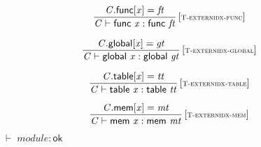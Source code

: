 \vspace{1ex}

$$
\begin{array}{@{}c@{}}\displaystyle
\frac{
{\mathit{C}}.\mathsf{func}{}[{\mathit{x}}] = {\mathit{ft}}
}{
{\mathit{C}} \vdash \mathsf{func}~{\mathit{x}} : \mathsf{func}~{\mathit{ft}}
} \, {[\textsc{\scriptsize T{-}externidx{-}func}]}
\qquad
\end{array}
$$

$$
\begin{array}{@{}c@{}}\displaystyle
\frac{
{\mathit{C}}.\mathsf{global}{}[{\mathit{x}}] = {\mathit{gt}}
}{
{\mathit{C}} \vdash \mathsf{global}~{\mathit{x}} : \mathsf{global}~{\mathit{gt}}
} \, {[\textsc{\scriptsize T{-}externidx{-}global}]}
\qquad
\end{array}
$$

$$
\begin{array}{@{}c@{}}\displaystyle
\frac{
{\mathit{C}}.\mathsf{table}{}[{\mathit{x}}] = {\mathit{tt}}
}{
{\mathit{C}} \vdash \mathsf{table}~{\mathit{x}} : \mathsf{table}~{\mathit{tt}}
} \, {[\textsc{\scriptsize T{-}externidx{-}table}]}
\qquad
\end{array}
$$

$$
\begin{array}{@{}c@{}}\displaystyle
\frac{
{\mathit{C}}.\mathsf{mem}{}[{\mathit{x}}] = {\mathit{mt}}
}{
{\mathit{C}} \vdash \mathsf{mem}~{\mathit{x}} : \mathsf{mem}~{\mathit{mt}}
} \, {[\textsc{\scriptsize T{-}externidx{-}mem}]}
\qquad
\end{array}
$$

\vspace{1ex}

$\boxed{{ \vdash }\;{\mathit{module}} : \mathsf{ok}}$

